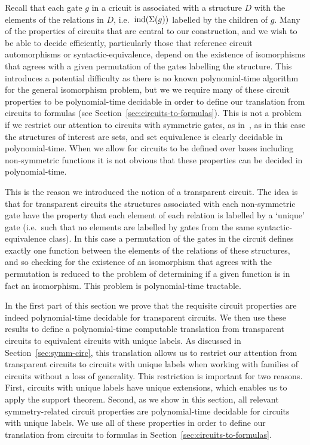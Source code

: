 \documentclass[../paper.tex]{subfiles}
\begin{document}
Recall that each gate $g$ in a cricuit  is associated with a structure
$D$ with the elements of the relations in $D$, i.e.\ $\text{\upshape ind}(\Sigma(g))$
labelled by the children of $g$.  Many of the properties of circuits
that are central to our construction, and we wish to be able to decide
efficiently, particularly those that reference circuit automorphisms or
syntactic-equivalence, depend on the existence of isomorphisms that agrees with a
given permutation of the gates labelling the structure.  This introduces a
potential difficulty as there is no known polynomial-time algorithm for the
general isomorphism problem, but we we require many of these circuit properties
to be polynomial-time decidable in order to define our translation from circuits
to formulas (see Section~\ref{sec:circuits-to-formulas}).  This is not a problem
if we restrict our attention to circuits with symmetric gates, as
in~\cite{AndersonD17}, as in this case the structures of interest are
sets, and set equivalence is clearly decidable in polynomial-time.  When we
allow for circuits to be defined over bases including non-symmetric functions it
is not obvious that these properties can be decided in polynomial-time.

This is the reason we introduced the notion of a transparent circuit. The idea
is that for transparent circuits the structures associated with each
non-symmetric gate have the property that each element of each relation is
labelled by a `unique' gate (i.e.\ such that no elements are labelled by gates
from the same syntactic-equivalence class). In this case a permutation of the
gates in the circuit defines exactly one function between the elements of the
relations of these structures, and so checking for the existence of an
isomorphism that agrees with the permutation is reduced to the problem of
determining if a given function is in fact an isomorphism. This problem is
polynomial-time tractable.

In the first part of this section we prove that the requisite circuit properties
are indeed polynomial-time decidable for transparent circuits. We then use these
results to define a polynomial-time computable translation from transparent
circuits to equivalent circuits with unique labels. As discussed in
Section~\ref{sec:symm-circ}, this translation allows us to restrict our
attention from transparent circuits to circuits with unique labels when working
with families of circuits without a loss of generality. This restriction is
important for two reasons. First, circuits with unique labels have unique
extensions, which enables us to apply the support theorem. Second, as we
show in this section, all relevant symmetry-related circuit properties are
polynomial-time decidable for circuits with unique labels. We use all of these
properties in order to define our translation from circuits to formulas in
Section~\ref{sec:circuits-to-formulas}.
\end{document}
